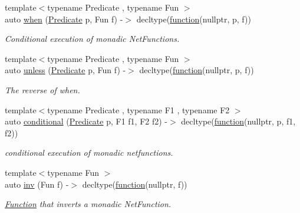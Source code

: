 \begin{DoxyCompactItemize}
{\footnotesize template$<$typename Predicate , typename Fun $>$ }\\auto \hyperlink{namespacepfq_1_1lang_1_1anonymous__namespace_02default_8hpp_03_a2d4da33f2a8bc0abe351c8531bfd161f}{when} (\hyperlink{structpfq_1_1lang_1_1Predicate}{Predicate} p, Fun f) -\/$>$ decltype(\hyperlink{namespacepfq_1_1lang_a1a4638059d700ae08d0ca63886ff2bb3}{function}(nullptr, p, f))
\begin{DoxyCompactList}\small\item\em Conditional execution of monadic Net\+Functions. \end{DoxyCompactList}\item 
{\footnotesize template$<$typename Predicate , typename Fun $>$ }\\auto \hyperlink{namespacepfq_1_1lang_1_1anonymous__namespace_02default_8hpp_03_a02b7a7ced297504fd2fac0c627c60394}{unless} (\hyperlink{structpfq_1_1lang_1_1Predicate}{Predicate} p, Fun f) -\/$>$ decltype(\hyperlink{namespacepfq_1_1lang_a1a4638059d700ae08d0ca63886ff2bb3}{function}(nullptr, p, f))
\begin{DoxyCompactList}\small\item\em The reverse of {\ttfamily when}. \end{DoxyCompactList}\item 
{\footnotesize template$<$typename Predicate , typename F1 , typename F2 $>$ }\\auto \hyperlink{namespacepfq_1_1lang_1_1anonymous__namespace_02default_8hpp_03_a4c2783d63248b4a03efebee81e68cad3}{conditional} (\hyperlink{structpfq_1_1lang_1_1Predicate}{Predicate} p, F1 f1, F2 f2) -\/$>$ decltype(\hyperlink{namespacepfq_1_1lang_a1a4638059d700ae08d0ca63886ff2bb3}{function}(nullptr, p, f1, f2))
\begin{DoxyCompactList}\small\item\em conditional execution of monadic netfunctions. \end{DoxyCompactList}\item 
{\footnotesize template$<$typename Fun $>$ }\\auto \hyperlink{namespacepfq_1_1lang_1_1anonymous__namespace_02default_8hpp_03_a5b2869b170967bd1680723a5af1b3fee}{inv} (Fun f) -\/$>$ decltype(\hyperlink{namespacepfq_1_1lang_a1a4638059d700ae08d0ca63886ff2bb3}{function}(nullptr, f))
\begin{DoxyCompactList}\small\item\em \hyperlink{structpfq_1_1lang_1_1Function}{Function} that inverts a monadic Net\+Function. \end{DoxyCompactList}\item 

\end{DoxyCompactItemize}
